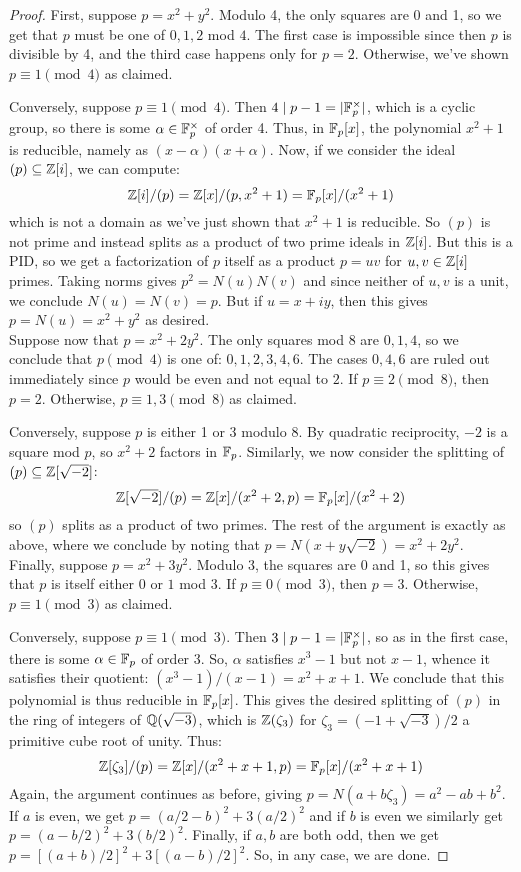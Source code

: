 \begin{proof}
	First, suppose $p = x^2+y^2$. Modulo 4, the only squares are 0 and 1, so we get that $p$ must be one of $0,1,2$ mod $4$. The first case is impossible since then $p$ is divisible by 4, and the third case happens only for $p=2$. Otherwise, we've shown $p \equiv 1 \pmod{4}$ as claimed.
	
	Conversely, suppose $p \equiv 1 \pmod{4}$. Then $4 \mid p-1 = |\mathbb{F}_p^\times|$, which is a cyclic group, so there is some $\alpha \in \mathbb{F}_p^\times$ of order 4. Thus, in $\mathbb{F}_p[x]$, the polynomial $x^2+1$ is reducible, namely as $(x-\alpha)(x+\alpha)$. Now, if we consider the ideal $(p) \subseteq \mathbb{Z}[i]$, we can compute:
	\[ \mathbb{Z}[i]/(p) = \mathbb{Z}[x]/(p,x^2+1) = \mathbb{F}_p[x]/(x^2+1) \]
	which is not a domain as we've just shown that $x^2+1$ is reducible. So $(p)$ is not prime and instead splits as a product of two prime ideals in $\mathbb{Z}[i]$. But this is a PID, so we get a factorization of $p$ itself as a product $p = uv$ for $u,v \in \mathbb{Z}[i]$ primes. Taking norms gives $p^2 = N(u)N(v)$ and since neither of $u,v$ is a unit, we conclude $N(u) = N(v) = p$. But if $u = x+iy$, then this gives $p = N(u) = x^2+y^2$ as desired. \\
	
	Suppose now that $p = x^2+2y^2$. The only squares mod 8 are $0,1,4$, so we conclude that $p \pmod{4}$ is one of: $0,1,2,3,4,6$. The cases $0,4,6$ are ruled out immediately since $p$ would be even and not equal to $2$. If $p \equiv 2 \pmod{8}$, then $p = 2$. Otherwise, $p \equiv 1,3 \pmod{8}$ as claimed.
	
	Conversely, suppose $p$ is either 1 or 3 modulo 8. By quadratic reciprocity, $-2$ is a square mod $p$, so $x^2+2$ factors in $\mathbb{F}_p$. Similarly, we now consider the splitting of $(p) \subseteq \mathbb{Z}[\sqrt{-2}]$:
	\[ \mathbb{Z}[\sqrt{-2}]/(p) = \mathbb{Z}[x]/(x^2+2,p) = \mathbb{F}_p[x]/(x^2+2) \]
	so $(p)$ splits as a product of two primes. The rest of the argument is exactly as above, where we conclude by noting that $p = N(x+y\sqrt{-2}) = x^2+2y^2$. \\
	
	Finally, suppose $p = x^2+3y^2$. Modulo 3, the squares are 0 and 1, so this gives that $p$ is itself either $0$ or $1$ mod 3. If $p \equiv 0 \pmod{3}$, then $p=3$. Otherwise, $p \equiv 1 \pmod{3}$ as claimed.
	
	Conversely, suppose $p \equiv 1 \pmod{3}$. Then $3 \mid p-1 = |\mathbb{F}_p^\times|$, so as in the first case, there is some $\alpha \in \mathbb{F}_p$ of order 3. So, $\alpha$ satisfies $x^3-1$ but not $x-1$, whence it satisfies their quotient: $(x^3-1)/(x-1) = x^2+x+1$. We conclude that this polynomial is thus reducible in $\mathbb{F}_p[x]$. This gives the desired splitting of $(p)$ in the ring of integers of $\mathbb{Q}(\sqrt{-3})$, which is $\mathbb{Z}(\zeta_3)$ for $\zeta_3 = (-1+\sqrt{-3})/2$ a primitive cube root of unity. Thus:
	\[ \mathbb{Z}[\zeta_3]/(p) = \mathbb{Z}[x]/(x^2+x+1,p) = \mathbb{F}_p[x]/(x^2+x+1) \]
	Again, the argument continues as before, giving $p = N(a+b\zeta_3) = a^2-ab+b^2$. If $a$ is even, we get $p = (a/2-b)^2 + 3(a/2)^2$ and if $b$ is even we similarly get $p = (a-b/2)^2 + 3(b/2)^2$. Finally, if $a,b$ are both odd, then we get $p = [(a+b)/2]^2 + 3[(a-b)/2]^2$. So, in any case, we are done.
\end{proof}
